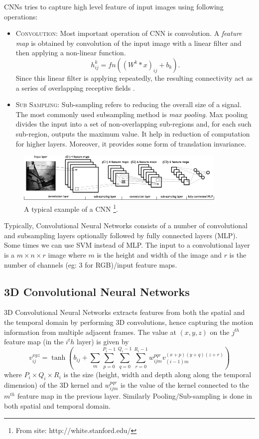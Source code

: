 \noindent CNNs tries to capture high level feature of input images using following operations:
\begin{itemize}
\item \textsc{Convolution}: Most important operation of CNN is convolution. A \textit{feature map} is obtained by convolution of the input image with a linear filter and then applying a non-linear function. 
$$h^k_{ij} = fn( (W^k * x)_{ij} + b_k ).$$
Since this linear filter is applying repeatedly, the resulting connectivity act as a series of overlapping receptive fields \cite{NIPS2012_4824}.
\item \textsc{Sub Sampling}: Sub-sampling refers to reducing the overall size of a signal. The most commonly used subsampling method is \textit{max pooling}. Max pooling divides the input into a set of non-overlapping sub-regions and, for each such sub-region, outputs the maximum value. It help in reduction of computation for higher layers. Moreover, it provides some form of translation invariance. 
\end{itemize}

\begin{figure}[!ht]
\centering
\includegraphics[width=0.9\textwidth]{./imgs/cnn1.png} 
\caption[An example of a convolutional neural network]{A typical example of a CNN \footnote{From site: http://white.stanford.edu/}. }
\label{fig:cnn_layer}
\end{figure}

Typically, Convolutional Neural Networks consists of a number of convolutional and subsampling layers optionally followed by fully connected layers (MLP). Some times we can use SVM instead of MLP. The input to a convolutional layer is a $m \times n \times r$ image where $m$ is the height and width of the image and $r$ is the number of channels (eg: 3 for RGB)/input feature maps. 

\subsection{3D Convolutional Neural Networks}
3D Convolutional Neural Networks extracts features from both the spatial and the temporal domain by performing 3D convolutions, hence capturing the motion information from multiple adjacent frames.\cite{ji20133d} The value at $(x, y, z)$ on the $j^{th}$ feature map (in the $i^th$ layer) is given by
$$v^{xyz}_{ij} = \tanh(b_{ij}+\sum_{m} \sum_{p=0}^{P_i-1} \sum_{q=0}^{Q_i-1} \sum_{r=0}^{R_i-1} w^{pqr}_{ijm} v^{(x+p)(y+q)(z+r)}_{(i−1)m}) $$
where $P_i \times Q_i \times R_i$ is the size (height, width and depth along along the temporal
dimension) of the 3D kernel and $w^{pqr}_{ijm}$ is the value of the kernel connected to the $m^{th}$ feature map in the previous layer. Similarly Pooling/Sub-sampling is done in both spatial and temporal domain.

